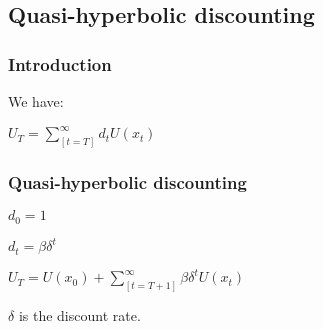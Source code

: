 
\subsection{Quasi-hyperbolic discounting}

\subsubsection{Introduction}

We have:

\(U_T=\sum_[t=T]^{\infty }d_tU(x_t)\)

\subsubsection{Quasi-hyperbolic discounting}

\(d_0=1\)

\(d_t=\beta \delta^t\)

\(U_T=U(x_0)+\sum_[t=T+1]^{\infty }\beta \delta ^tU(x_t)\)

\(\delta \) is the discount rate.

